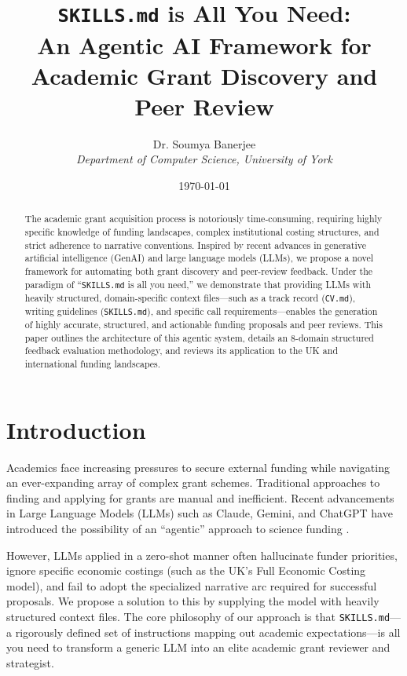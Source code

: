 \documentclass[11pt, a4paper]{article}
\title{\texttt{SKILLS.md} is All You Need: \\ An Agentic AI Framework for Academic Grant Discovery and Peer Review}
\author{Dr. Soumya Banerjee \\ \textit{Department of Computer Science, University of York}}
\date{\today}
\begin{document}
\maketitle

\begin{abstract}
The academic grant acquisition process is notoriously time-consuming, requiring highly specific knowledge of funding landscapes, complex institutional costing structures, and strict adherence to narrative conventions. Inspired by recent advances in generative artificial intelligence (GenAI) and large language models (LLMs), we propose a novel framework for automating both grant discovery and peer-review feedback. Under the paradigm of ``\texttt{SKILLS.md} is all you need,'' we demonstrate that providing LLMs with heavily structured, domain-specific context files---such as a track record (\texttt{CV.md}), writing guidelines (\texttt{SKILLS.md}), and specific call requirements---enables the generation of highly accurate, structured, and actionable funding proposals and peer reviews. This paper outlines the architecture of this agentic system, details an 8-domain structured feedback evaluation methodology, and reviews its application to the UK and international funding landscapes.
\end{abstract}

\section{Introduction}
Academics face increasing pressures to secure external funding while navigating an ever-expanding array of complex grant schemes. Traditional approaches to finding and applying for grants are manual and inefficient. Recent advancements in Large Language Models (LLMs) such as Claude, Gemini, and ChatGPT have introduced the possibility of an ``agentic'' approach to science funding \cite{vaswani2017attention, bommasani2021opportunities}. 

However, LLMs applied in a zero-shot manner often hallucinate funder priorities, ignore specific economic costings (such as the UK's Full Economic Costing model), and fail to adopt the specialized narrative arc required for successful proposals. We propose a solution to this by supplying the model with heavily structured context files. The core philosophy of our approach is that \texttt{SKILLS.md}---a rigorously defined set of instructions mapping out academic expectations---is all you need to transform a generic LLM into an elite academic grant reviewer and strategist.
\end{document}
